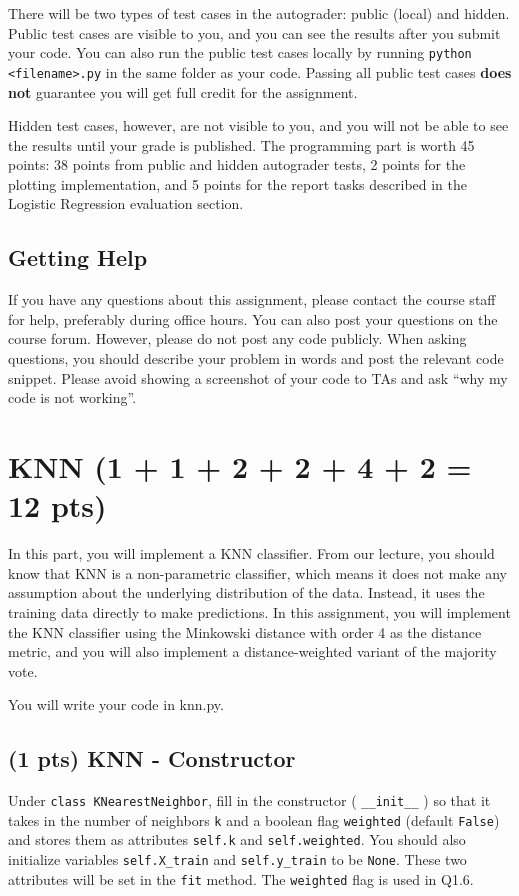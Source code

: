 \documentclass{article}
\begin{document}
There will be two types of test cases in the autograder: public (local) and hidden. Public test cases are visible to you, and you can see the results after you submit your code. You can also run the public test cases locally by running \verb|python <filename>.py| in the same folder as your code. Passing all public test cases \textbf{does not} guarantee you will get full credit for the assignment.

Hidden test cases, however, are not visible to you, and you will not be able to see the results until
your grade is published. The programming part is worth 45 points: 38 points from public and hidden autograder tests, 2 points for the plotting implementation, and 5 points for the report tasks described in the Logistic Regression evaluation section.

\subsection*{Getting Help}
If you have any questions about this assignment, please contact the course staff for help, preferably during office hours. You can also post your questions on the course forum. However, please do not post any code publicly. When asking questions, you should describe your problem in words and post the relevant code snippet. Please avoid showing a screenshot of your code to TAs and ask ``why my code is not working''.


\section{KNN (1 + 1 + 2 + 2 + 4 + 2 = 12 pts)}
In this part, you will implement a KNN classifier. From our lecture, you should know that KNN is a
non-parametric classifier, which means it does not make any assumption about the underlying
distribution of the data. Instead, it uses the training data directly to make predictions. In this
assignment, you will implement the KNN classifier using the Minkowski distance with order 4 as the distance
metric, and you will also implement a distance-weighted variant of the majority vote.

You will write your code in knn.py.

\subsection{(1 pts)  KNN - Constructor}
Under \verb|class KNearestNeighbor|, fill in the constructor ( \verb|__init__| ) so that it takes in the number of
neighbors \verb|k| and a boolean flag \verb|weighted| (default \verb|False|) and stores them as attributes \verb|self.k| and \verb|self.weighted|. You should also initialize variables \verb|self.X_train| and
\verb|self.y_train| to be \verb|None|. These two attributes will be set in the \verb|fit| method. The \verb|weighted| flag is used in Q1.6.
\end{document}
